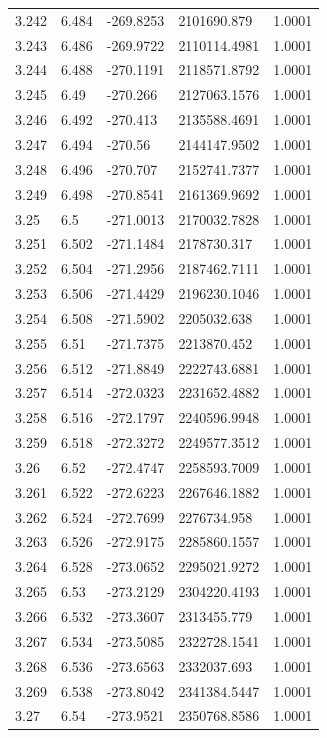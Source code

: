 \begin{tabular}{lllll}
3.242 & 6.484 & -269.8253 & 2101690.879 & 1.0001 \\
3.243 & 6.486 & -269.9722 & 2110114.4981 & 1.0001 \\
3.244 & 6.488 & -270.1191 & 2118571.8792 & 1.0001 \\
3.245 & 6.49 & -270.266 & 2127063.1576 & 1.0001 \\
3.246 & 6.492 & -270.413 & 2135588.4691 & 1.0001 \\
3.247 & 6.494 & -270.56 & 2144147.9502 & 1.0001 \\
3.248 & 6.496 & -270.707 & 2152741.7377 & 1.0001 \\
3.249 & 6.498 & -270.8541 & 2161369.9692 & 1.0001 \\
3.25 & 6.5 & -271.0013 & 2170032.7828 & 1.0001 \\
3.251 & 6.502 & -271.1484 & 2178730.317 & 1.0001 \\
3.252 & 6.504 & -271.2956 & 2187462.7111 & 1.0001 \\
3.253 & 6.506 & -271.4429 & 2196230.1046 & 1.0001 \\
3.254 & 6.508 & -271.5902 & 2205032.638 & 1.0001 \\
3.255 & 6.51 & -271.7375 & 2213870.452 & 1.0001 \\
3.256 & 6.512 & -271.8849 & 2222743.6881 & 1.0001 \\
3.257 & 6.514 & -272.0323 & 2231652.4882 & 1.0001 \\
3.258 & 6.516 & -272.1797 & 2240596.9948 & 1.0001 \\
3.259 & 6.518 & -272.3272 & 2249577.3512 & 1.0001 \\
3.26 & 6.52 & -272.4747 & 2258593.7009 & 1.0001 \\
3.261 & 6.522 & -272.6223 & 2267646.1882 & 1.0001 \\
3.262 & 6.524 & -272.7699 & 2276734.958 & 1.0001 \\
3.263 & 6.526 & -272.9175 & 2285860.1557 & 1.0001 \\
3.264 & 6.528 & -273.0652 & 2295021.9272 & 1.0001 \\
3.265 & 6.53 & -273.2129 & 2304220.4193 & 1.0001 \\
3.266 & 6.532 & -273.3607 & 2313455.779 & 1.0001 \\
3.267 & 6.534 & -273.5085 & 2322728.1541 & 1.0001 \\
3.268 & 6.536 & -273.6563 & 2332037.693 & 1.0001 \\
3.269 & 6.538 & -273.8042 & 2341384.5447 & 1.0001 \\
3.27 & 6.54 & -273.9521 & 2350768.8586 & 1.0001 \\

\end{tabular}
